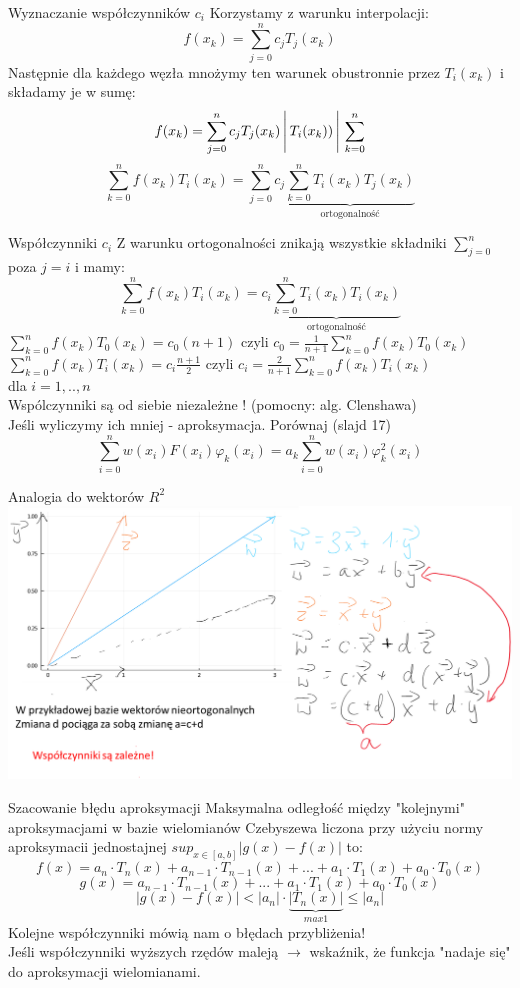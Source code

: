 \begin{frame}{Wyznaczanie współczynników $c_i$}
Korzystamy z warunku interpolacji:
	$$f(x_k)= \sum_{j=0}^{n}c_jT_j(x_k)$$
	Następnie dla każdego węzła mnożymy ten warunek obustronnie przez $T_i(x_k)$ i składamy je w sumę:
	$$f(x_k)= \sum_{j=0}^{n}c_jT_j(x_k)\Bigg\arrowvert T_i(x_k)) \Bigg\arrowvert \sum_{k=0}^{n}$$
    $$\sum_{k=0}^{n}f(x_k)T_i(x_k)=\sum_{j=0}^{n}c_j\underbrace{\sum_{k=0}^{n}T_i(x_k)T_j(x_k)}_{\text{ortogonalność}}$$
\end{frame}
\begin{frame}{Współczynniki $c_i$}
Z warunku ortogonalności znikają wszystkie składniki $\sum_{j=0}^{n}$ poza $j=i$ i mamy:
 $$\sum_{k=0}^{n}f(x_k)T_i(x_k)=c_i\underbrace{\sum_{k=0}^{n}T_i(x_k)T_i(x_k)}_{\text{ortogonalność}}$$
 $\sum_{k=0}^{n}f(x_k)T_0(x_k)=c_0(n+1)$ czyli 
 $c_0 = \frac{1}{n+1}\sum_{k=0}^{n}f(x_k)T_0(x_k)$\\
 \vspace{0.5cm}
 $\sum_{k=0}^{n}f(x_k)T_i(x_k)=c_i\frac{n+1}{2}$ czyli
 $c_i = \frac{2}{n+1}\sum_{k=0}^{n}f(x_k)T_i(x_k)$\\
 dla $ i=1,..,n$\\
 Wspólczynniki są od siebie niezależne ! (pomocny: alg. Clenshawa)\\
Jeśli wyliczymy ich mniej - aproksymacja. Porównaj (slajd 17) 
$$\sum_{i=0}^{n}w(x_i)F(x_i)\varphi_k(x_i)=a_k\sum_{i=0}^{n}w(x_i)\varphi_k^2(x_i)$$
\end{frame}
\begin{frame}{Analogia do wektorów $R^2$}
    \includegraphics[height=0.7\textheight]{img/5/ortovsnieorto.png}
\end{frame}
\begin{frame}{Szacowanie błędu aproksymacji}
Maksymalna odległość między "kolejnymi" aproksymacjami w bazie wielomianów Czebyszewa liczona przy użyciu normy aproksymacii jednostajnej $sup_{x \in [a,b]}|g(x)-f(x)|$ to:
    $$f(x)=a_n\cdot T_{n}(x)+a_{n-1}\cdot T_{n-1}(x)+...+a_1\cdot T_{1}(x)+a_0\cdot T_{0}(x)$$
     $$g(x)=a_{n-1}\cdot T_{n-1}(x)+...+a_1\cdot T_{1}(x)+a_0\cdot T_{0}(x)$$
     $$|g(x)-f(x)|< |a_n|\cdot \underbrace{|T_{n}(x)|}_{max 1}\le |a_n|$$
     Kolejne współczynniki mówią nam o błędach przybliżenia!\\
     Jeśli współczynniki wyższych rzędów maleją $\rightarrow$ wskaźnik, że funkcja "nadaje się" do aproksymacji wielomianami.\\
    
\end{frame}
